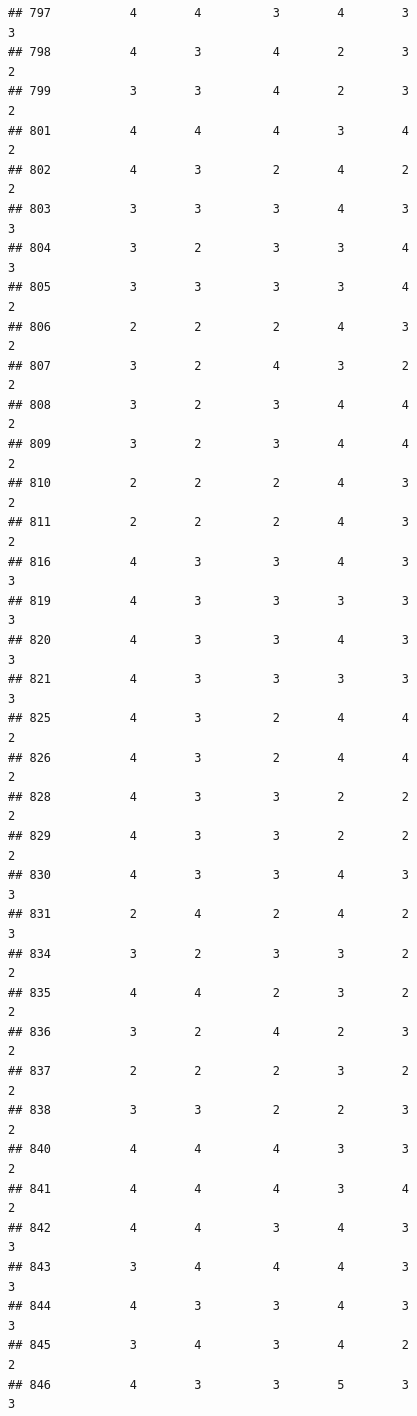 \documentclass[
]{article}
\begin{document}
\begin{verbatim}
## 797           4        4          3        4        3               3
## 798           4        3          4        2        3               2
## 799           3        3          4        2        3               2
## 801           4        4          4        3        4               2
## 802           4        3          2        4        2               2
## 803           3        3          3        4        3               3
## 804           3        2          3        3        4               3
## 805           3        3          3        3        4               2
## 806           2        2          2        4        3               2
## 807           3        2          4        3        2               2
## 808           3        2          3        4        4               2
## 809           3        2          3        4        4               2
## 810           2        2          2        4        3               2
## 811           2        2          2        4        3               2
## 816           4        3          3        4        3               3
## 819           4        3          3        3        3               3
## 820           4        3          3        4        3               3
## 821           4        3          3        3        3               3
## 825           4        3          2        4        4               2
## 826           4        3          2        4        4               2
## 828           4        3          3        2        2               2
## 829           4        3          3        2        2               2
## 830           4        3          3        4        3               3
## 831           2        4          2        4        2               3
## 834           3        2          3        3        2               2
## 835           4        4          2        3        2               2
## 836           3        2          4        2        3               2
## 837           2        2          2        3        2               2
## 838           3        3          2        2        3               2
## 840           4        4          4        3        3               2
## 841           4        4          4        3        4               2
## 842           4        4          3        4        3               3
## 843           3        4          4        4        3               3
## 844           4        3          3        4        3               3
## 845           3        4          3        4        2               2
## 846           4        3          3        5        3               3

\end{verbatim}
\end{document}
